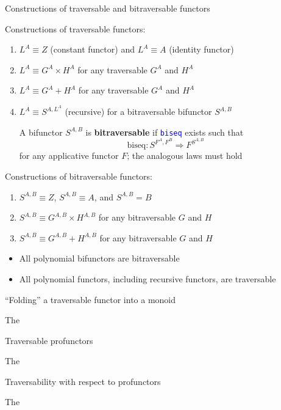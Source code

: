 \documentclass[english]{beamer}
\begin{document}
\begin{frame}{Constructions of traversable and bitraversable functors}

Constructions of traversable functors:
\begin{enumerate}
\item $L^{A}\equiv Z$ (constant functor) and $L^{A}\equiv A$ (identity
functor)
\item $L^{A}\equiv G^{A}\times H^{A}$ for any traversable $G^{A}$ and
$H^{A}$
\item $L^{A}\equiv G^{A}+H^{A}$ for any traversable $G^{A}$ and $H^{A}$
\item $L^{A}\equiv S^{A,L^{A}}$ (recursive) for a bitraversable bifunctor
$S^{A,B}$ 

A bifunctor $S^{A,B}$ is \textbf{bitraversable} if \texttt{\textcolor{blue}{\footnotesize{}biseq}}
exists such that
\[
\text{biseq}:S^{F^{A},F^{B}}\Rightarrow F^{S^{A,B}}
\]
 for any applicative functor $F$; the analogous laws must hold
\end{enumerate}
Constructions of bitraversable functors:
\begin{enumerate}
\item $S^{A,B}\equiv Z$, $S^{A,B}\equiv A$, and $S^{A,B}=B$
\item $S^{A,B}\equiv G^{A,B}\times H^{A,B}$ for any bitraversable $G$
and $H$
\item $S^{A,B}\equiv G^{A,B}+H^{A,B}$ for any bitraversable $G$ and $H$
\end{enumerate}
\begin{itemize}
\item All polynomial bifunctors are bitraversable
\item All polynomial functors, including recursive functors, are traversable
\end{itemize}
\end{frame}

\begin{frame}{``Folding'' a traversable functor into a monoid}

\vspace{-0.15cm}The 
\end{frame}

\begin{frame}{Traversable profunctors}

\vspace{-0.15cm}The
\end{frame}

\begin{frame}{Traversability with respect to profunctors}

\vspace{-0.15cm}The
\end{frame}
\end{document}
